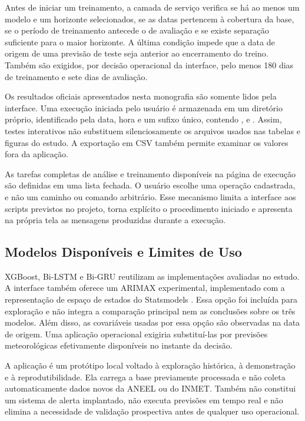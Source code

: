 Antes de iniciar um treinamento, a camada de serviço verifica se há ao menos um modelo e um horizonte selecionados, se as datas pertencem à cobertura da base, se o período de treinamento antecede o de avaliação e se existe separação suficiente para o maior horizonte. A última condição impede que a data de origem de uma previsão de teste seja anterior ao encerramento do treino. Também são exigidos, por decisão operacional da interface, pelo menos 180 dias de treinamento e sete dias de avaliação.

Os resultados oficiais apresentados nesta monografia são somente lidos pela interface. Uma execução iniciada pelo usuário é armazenada em um diretório próprio, identificado pela data, hora e um sufixo único, contendo ,  e . Assim, testes interativos não substituem silenciosamente os arquivos usados nas tabelas e figuras do estudo. A exportação em CSV também permite examinar os valores fora da aplicação.

As tarefas completas de análise e treinamento disponíveis na página de execução são definidas em uma lista fechada. O usuário escolhe uma operação cadastrada, e não um caminho ou comando arbitrário. Esse mecanismo limita a interface aos scripts previstos no projeto, torna explícito o procedimento iniciado e apresenta na própria tela as mensagens produzidas durante a execução.

\subsection{Modelos Disponíveis e Limites de Uso}

XGBoost, Bi-LSTM e Bi-GRU reutilizam as implementações avaliadas no estudo. A interface também oferece um ARIMAX experimental, implementado com a representação de espaço de estados do Statsmodels \cite{seabold2010statsmodels}. Essa opção foi incluída para exploração e não integra a comparação principal nem as conclusões sobre os três modelos. Além disso, as covariáveis usadas por essa opção são observadas na data de origem. Uma aplicação operacional exigiria substituí-las por previsões meteorológicas efetivamente disponíveis no instante da decisão.

A aplicação é um protótipo local voltado à exploração histórica, à demonstração e à reprodutibilidade. Ela carrega a base previamente processada e não coleta automaticamente dados novos da ANEEL ou do INMET. Também não constitui um sistema de alerta implantado, não executa previsões em tempo real e não elimina a necessidade de validação prospectiva antes de qualquer uso operacional.

